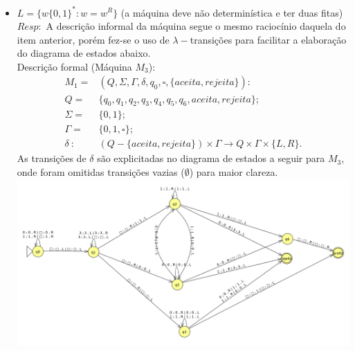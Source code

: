 \documentclass{homework}
\begin{document}
\begin{itemize}
		\item $L = \{w  \{0,1\}^*: w = w^R\}$ (a máquina deve não determinística e ter duas fitas)\\
		$Resp:$ A descrição informal da máquina segue o mesmo raciocínio daquela do item anterior, porém fez-se o uso de $\lambda-$transições para facilitar a elaboração do diagrama de estados abaixo.\\
		\quad Descrição formal (Máquina $M_3$):
		\begin{align*}
			M_1 = & (Q,\Sigma, \Gamma, \delta, q_0, \square, \{aceita,rejeita\}):\\
			Q = & \{q_0,q_1,q_2,q_3,q_4,q_5,q_6,aceita,rejeita\};\\
			\Sigma = & \{0,1\};\\
			\Gamma = & \{0,1,\square\};\\
			\delta\ :\ & (Q - \{aceita,rejeita\}) \times \Gamma \rightarrow Q \times \Gamma \times \{L,R\}.
		\end{align*}
		As transições de $\delta$ são explicitadas no diagrama de estados a seguir para $M_3$, onde foram omitidas transições vazias ($\emptyset$) para maior clareza.\\
		\includegraphics[scale=.4]{"images/L7E6-3"}		
	\end{itemize}

\pagebreak
\end{document}
